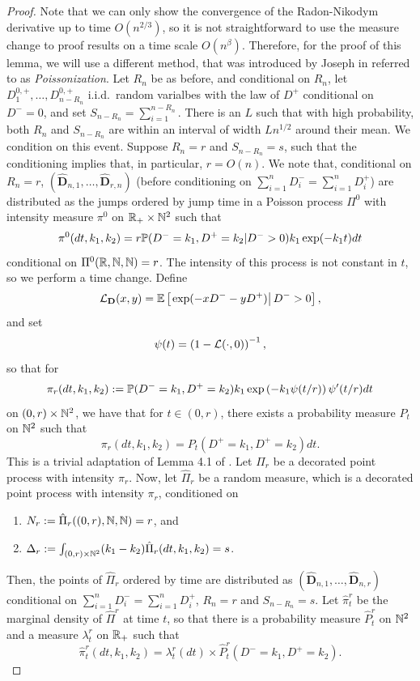 \begin{proof}
Note that we can only show the convergence of the Radon-Nikodym derivative up to time $O(n^{2/3})$, so it is not straightforward to use the measure change to proof results on a time scale $O(n^\beta)$. Therefore, for the proof of this lemma, we will use a different method, that was introduced by Joseph in \cite{josephComponentSizesCritical2014} referred to as \emph{Poissonization}. Let $R_n$ be as before, and conditional on $R_n$, let $D^{0,+}_1,\dots,D^{0,+}_{n-R_n}$ i.i.d.\ random varialbes with the law of $D^+$ conditional on $D^-=0$, and set $S_{n-R_n}=\sum_{i=1}^{n-R_n}$. There is an $L$ such that with high probability, both $R_n$ and $S_{n-R_n}$ are within an interval of width $Ln^{1/2}$ around their mean. We condition on this event. Suppose $R_n=r$ and $S_{n-R_n}=s$, such that the conditioning implies that, in particular, $r=O(n)$. We note that, conditional on $R_n=r$, $(\mathbf{\hat{D}}_{n,1},\dots,\mathbf{\hat{D}}_{r,n})$ (before conditioning on $\sum_{i=1}^nD^-_i=\sum_{i=1}^nD^+_i$) are distributed as the jumps ordered by jump time in a Poisson process $\Pi^0$ with intensity measure $\pi^0$ on $\R_+\times \N^2$ such that $$\pi^0(dt,k_1,k_2)=r\P(D^-=k_1,D^+=k_2|D^->0)k_1\exp(-k_1 t)dt$$
conditional on $\Pi^0(\R,\N,\N)=r$.
The intensity of this process is not constant in $t$, so we perform a time change. Define
$$\cL_{\mathbf{D}}(x,y)=\E\left[\left.\exp(-xD^--yD^+)\right|D^->0 \right],$$
and set 
$$\psi(t)=\left(1-\cL(\cdot,0)\right)^{-1},$$
so that for 
$$\pi_r(dt,k_1,k_2):=\P(D^-=k_1,D^+=k_2)k_1\exp\left(-k_1 \psi(t/r)\right)\psi'(t/r)dt$$
on $(0,r)\times \N^2$, we have that for $t\in (0,r)$, there exists a probability measure $P_t$ on $\N^2$ such that
$$\pi_r(dt,k_1,k_2)=P_t(D^+=k_1,D^+=k_2)dt.$$
This is a trivial adaptation of Lemma 4.1 of \cite{josephComponentSizesCritical2014}. Let ${\Pi}_r$ be a decorated point process with intensity $\pi_r$.  Now, let $\hat{\Pi}_r$ be a random measure, which is a decorated point process with intensity $\pi_r$, conditioned on 
\begin{enumerate}
    \item $N_r:= \hat{\Pi}_r((0,r),\N,\N)=r$, and 
    \item $\Delta_r:=\int_{(0,r)\times \N^2}(k_1-k_2) \hat{\Pi}_r(dt,k_1,k_2)=s$.
\end{enumerate}
Then, the points of $\hat{\Pi}_r$ ordered by time are distributed as $(\mathbf{\hat{D}}_{n,1},\dots,\mathbf{\hat{D}}_{n,r})$ conditional on $\sum_{i=1}^nD^-_i=\sum_{i=1}^nD^+_i$, $R_n=r$ and $S_{n-R_n}=s$. Let $\hat{\pi}^r_t$ be the marginal density of $\hat{\Pi}^r$ at time $t$, so that there is a probability measure $\hat{P}^r_t$ on $\N^2$  and a measure $\lambda^r_t$ on $\R_+$ such that $$\hat{\pi}^r_t(dt,k_1,k_2)=\lambda^r_t(dt)\times \hat{P}^r_t(D^-=k_1, D^+=k_2).$$

\end{proof}
